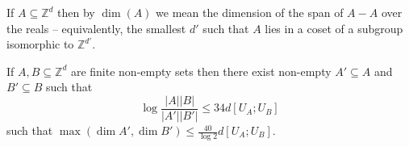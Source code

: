 \begin{definition}\label{dimension-def}\leanok
If $A\subseteq \mathbb{Z}^{d}$ then by $\dim(A)$ we mean the dimension of the span of $A-A$ over the reals -- equivalently, the smallest $d'$ such that $A$ lies in a coset of a subgroup isomorphic to $\mathbb{Z}^{d'}$.
\end{definition}


\begin{theorem}\label{weak-pfr-asymm}\leanok
If $A,B\subseteq \mathbb{Z}^d$ are finite non-empty sets then there exist non-empty $A'\subseteq A$ and $B'\subseteq B$ such that
\[\log\frac{\lvert A\rvert\lvert B\rvert}{\lvert A'\rvert\lvert B'\rvert}\leq 34d[U_A;U_B]\]
such that $\max(\dim A',\dim B')\leq \frac{40}{\log 2} d[U_A;U_B]$.
\end{theorem}
